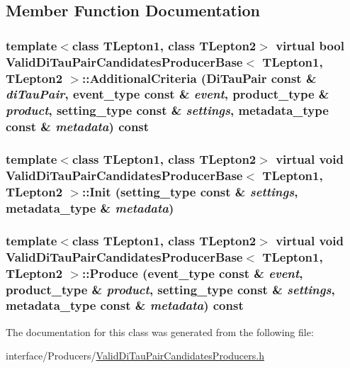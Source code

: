 \subsection{Member Function Documentation}
\hypertarget{classValidDiTauPairCandidatesProducerBase_addca0dffbd06ba4ffb76518f85144e75}{
\subsubsection[{AdditionalCriteria}]{\setlength{\rightskip}{0pt plus 5cm}template$<$class TLepton1, class TLepton2$>$ virtual bool {\bf ValidDiTauPairCandidatesProducerBase}$<$ TLepton1, TLepton2 $>$::AdditionalCriteria ({\bf DiTauPair} const \& {\em diTauPair}, \/  event\_\-type const \& {\em event}, \/  product\_\-type \& {\em product}, \/  setting\_\-type const \& {\em settings}, \/  metadata\_\-type const \& {\em metadata}) const}}
\label{classValidDiTauPairCandidatesProducerBase_addca0dffbd06ba4ffb76518f85144e75}
\hypertarget{classValidDiTauPairCandidatesProducerBase_a981ac448f8ca76e5458fb33e5b50ed32}{
\subsubsection[{Init}]{\setlength{\rightskip}{0pt plus 5cm}template$<$class TLepton1, class TLepton2$>$ virtual void {\bf ValidDiTauPairCandidatesProducerBase}$<$ TLepton1, TLepton2 $>$::Init (setting\_\-type const \& {\em settings}, \/  metadata\_\-type \& {\em metadata})}}
\label{classValidDiTauPairCandidatesProducerBase_a981ac448f8ca76e5458fb33e5b50ed32}
\hypertarget{classValidDiTauPairCandidatesProducerBase_ae99afcc869a696d8ea6ab910b03fd22b}{
\subsubsection[{Produce}]{\setlength{\rightskip}{0pt plus 5cm}template$<$class TLepton1, class TLepton2$>$ virtual void {\bf ValidDiTauPairCandidatesProducerBase}$<$ TLepton1, TLepton2 $>$::Produce (event\_\-type const \& {\em event}, \/  product\_\-type \& {\em product}, \/  setting\_\-type const \& {\em settings}, \/  metadata\_\-type const \& {\em metadata}) const}}
\label{classValidDiTauPairCandidatesProducerBase_ae99afcc869a696d8ea6ab910b03fd22b}


The documentation for this class was generated from the following file:\begin{DoxyCompactItemize}
\item 
interface/Producers/\hyperlink{ValidDiTauPairCandidatesProducers_8h}{ValidDiTauPairCandidatesProducers.h}\end{DoxyCompactItemize}
